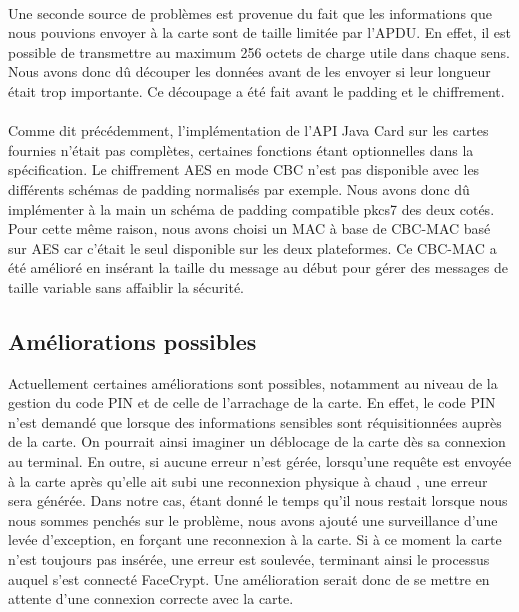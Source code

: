 \documentclass[a4paper,11pt,french]{article}
\begin{document}
\paragraph{}
Une seconde source de problèmes est provenue du fait que les informations que nous
 pouvions envoyer à la carte sont de taille limitée par l'APDU. En effet, il est possible de transmettre au maximum 256 octets de charge utile dans chaque sens. Nous avons donc dû découper les données avant de les envoyer 
si leur longueur était trop importante.
Ce découpage a été fait avant le padding et le chiffrement.


\paragraph{}
Comme dit précédemment, l'implémentation de l'API Java Card sur les cartes fournies n'était pas complètes, certaines fonctions étant optionnelles dans la 
spécification. Le chiffrement AES en mode CBC n'est pas disponible avec les différents schémas de padding normalisés par exemple. Nous avons donc dû implémenter 
à la main un schéma de padding compatible pkcs7 des deux cotés.
Pour cette même raison, nous avons choisi un MAC à base de CBC-MAC basé sur AES car c'était le seul disponible sur les deux plateformes.
Ce CBC-MAC a été amélioré en insérant la taille du message au début pour gérer des messages de taille variable sans affaiblir la sécurité. 








\subsection{Améliorations possibles}
Actuellement certaines améliorations sont possibles, notamment au niveau
de la gestion du code PIN et de celle de l'arrachage de la carte. En effet,
le code PIN n'est demandé que lorsque des informations sensibles sont
réquisitionnées auprès de la carte. On pourrait ainsi imaginer un déblocage
de la carte dès sa connexion au terminal. En outre, si aucune erreur n'est gérée,
lorsqu'une requête est envoyée à la carte après qu'elle ait subi une reconnexion
physique \og à chaud \fg{}, une erreur sera générée. Dans notre cas, étant donné
le temps qu'il nous restait lorsque nous nous sommes penchés sur le problème, 
nous avons ajouté une surveillance d'une levée d'exception, en forçant une 
reconnexion à la carte. Si à ce moment la carte n'est toujours pas insérée,
une erreur est soulevée, terminant ainsi le processus auquel s'est connecté
FaceCrypt. Une amélioration serait donc de se mettre en attente d'une connexion
correcte avec la carte.
\end{document}
